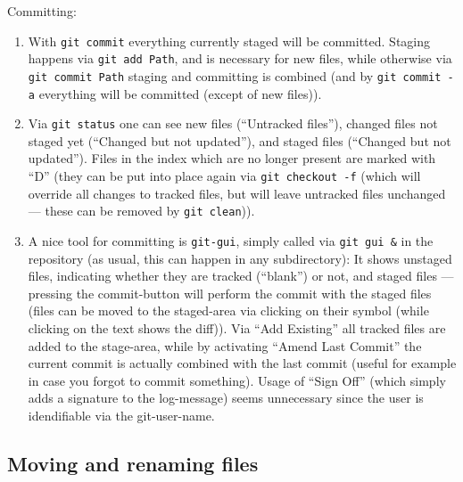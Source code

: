 \documentclass{book}
\newcommand{\name}[1]{\texttt{#1}}
\begin{document}
Committing:
\begin{enumerate}
\item With \texttt{git commit} everything currently staged will be committed. Staging happens via \texttt{git add Path}, and is necessary for new files, while otherwise via \texttt{git commit Path} staging and committing is combined (and by \texttt{git commit -a} everything will be committed (except of new files)).
\item Via \texttt{git status} one can see new files (``Untracked files''), changed files not staged yet (``Changed but not updated''), and staged files (``Changed but not updated''). Files in the index which are no longer present are marked with ``D'' (they can be put into place again via \texttt{git checkout -f} (which will override all changes to tracked files, but will leave untracked files unchanged --- these can be removed by \texttt{git clean})).
\item A nice tool for committing is \name{git-gui}, simply called via \texttt{git gui \&} in the repository (as usual, this can happen in any subdirectory): It shows unstaged files, indicating whether they are tracked (``blank'') or not, and staged files --- pressing the commit-button will perform the commit with the staged files (files can be moved to the staged-area via clicking on their symbol (while clicking on the text shows the diff)). Via ``Add Existing'' all tracked files are added to the stage-area, while by activating ``Amend Last Commit'' the current commit is actually combined with the last commit (useful for example in case you forgot to commit something). Usage of ``Sign Off'' (which simply adds a signature to the log-message) seems unnecessary since the user is idendifiable via the git-user-name.
\end{enumerate}



\subsection{Moving and renaming files}
\label{sec:GitMovingfiles}
\end{document}
